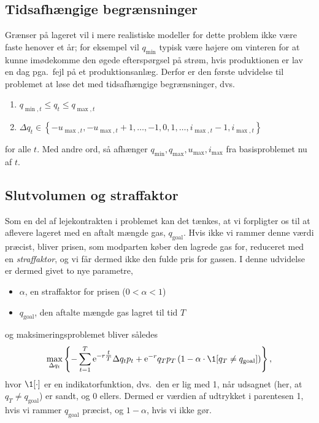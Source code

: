 \documentclass[12pt,a4paper,oneside,final]{article}
\begin{document}
\subsection{Tidsafhængige begrænsninger}
Grænser på lageret vil i mere realistiske modeller for dette problem ikke være faste henover et år;
for eksempel vil \(q_{\min}\) typisk være højere om vinteren for at kunne imødekomme den øgede efterspørgsel på strøm, hvis produktionen er lav en dag pga.\ fejl på et produktionsanlæg.
Derfor er den første udvidelse til problemet at løse det med tidsafhængige begrænsninger, dvs.\
\begin{enumerate}
\item \(q_{\min,t} \leq q_{t} \leq q_{\max,t}\)
\item \(\Delta q_{t} \in
    \left\{
    -u_{\max,t} , -u_{\max,t}+1 , \dotsc, -1, 0, 1, \dotsc, i_{\max,t} - 1 , i_{\max,t}
    \right\}\)
\end{enumerate}
for alle \(t\).
Med andre ord, så afhænger \(q_{\min}, q_{\max}, u_{\max}, i_{\max}\) fra basisproblemet nu af \(t\).

\subsection{Slutvolumen og straffaktor}
Som en del af lejekontrakten i problemet kan det tænkes, at vi forpligter os til at aflevere lageret med en aftalt mængde gas, \(q_{\mathrm{goal}}\).
Hvis ikke vi rammer denne værdi præcist, bliver prisen, som modparten køber den lagrede gas for, reduceret med en \emph{straffaktor}, og vi får dermed ikke den fulde pris for gassen.
I denne udvidelse er dermed givet to nye parametre,
\begin{itemize}
\item \(\alpha\), en straffaktor for prisen (\(0 < \alpha < 1\))
\item \(q_{\mathrm{goal}}\), den aftalte mængde gas lagret til tid \(T\)
\end{itemize}
og maksimeringsproblemet bliver således
\begin{equation}
  \max_{\Delta q_{t}}
  \left\{
    - \sum_{t = 1}^{T} \e^{-r\tfrac{t}{T}} \Delta q_{t} p_{t} + \e^{-r} q_{T}p_{T}
    \left(
      1 - \alpha \cdot \1 [q_{T} \neq q_{\mathrm{goal}}]
    \right)
  \right\} ,
\end{equation}
hvor \(\1[\cdot]\) er en indikatorfunktion, dvs.\ den er lig med 1, når udsagnet (her, at \(q_{T} \neq q_{\mathrm{goal}}\)) er sandt, og 0 ellers.
Dermed er værdien af udtrykket i parentesen 1, hvis vi rammer \(q_{\mathrm{goal}}\) præcist, og \(1 - \alpha\), hvis vi ikke gør.
\end{document}
